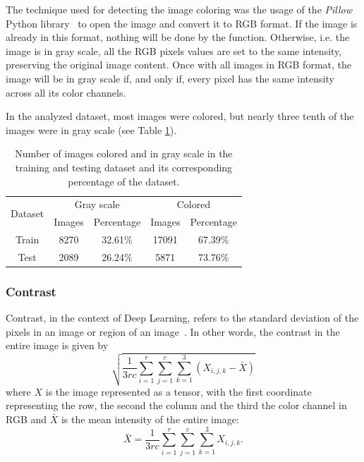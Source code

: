 \documentclass[12pt,
    brazil,			%
	english,        %
	]{article}
\begin{document}
The technique used for detecting the image coloring was the usage of the \textit{Pillow} Python library~\cite{pillow2019docs} to open the image and convert it to RGB format. If the image is already in this format, nothing will be done by the function. Otherwise, i.e. the image is in gray scale, all the RGB pixels values are set to the same intensity, preserving the original image content. Once with all images in RGB format, the image will be in gray scale if, and only if, every pixel has the same intensity across all its color channels.

In the analyzed dataset, most images were colored, but nearly three tenth of the images were in gray scale (see Table \ref{tab:color}).

\begin{table}[htb]
    \centering
    \setlength{\tabcolsep}{20pt} %
    \renewcommand{\arraystretch}{1.5} %
    \begin{tabular}{*{5}{c}}
        \toprule
        \multirow{2}{*}{Dataset}    & \multicolumn{2}{c}{Gray scale}    &   \multicolumn{2}{c}{Colored} \\
        \cmidrule(r){2-3} \cmidrule(r){4-5}
                                    & Images & Percentage               & Images & Percentage \\
        \midrule
        Train                       &   8270 &  32.61\%                 &  17091 &     67.39\% \\
        Test                        &   2089 &  26.24\%                 &   5871 &     73.76\% \\
        \bottomrule
    \end{tabular}
    \caption{Number of images colored and in gray scale in the training and testing dataset and its corresponding percentage of the dataset.}
    \label{tab:color}
\end{table}

\subsubsection{Contrast}

Contrast, in the context of Deep Learning, refers to the standard deviation of the pixels in an image or region of an image~\cite{goodfellow2016deep}. In other words, the contrast in the entire image is given by
\begin{equation}
\label{eq:constrast-rgb}
    \sqrt{\frac{1}{3rc}\sum_{i=1}^{r} \sum_{j=1}^{c} \sum_{k=1}^{3} \left(X_{i,j,k} - \bar{X}\right)}
\end{equation}
where $X$ is the image represented as a tensor, with the first coordinate representing the row, the second the column and the third the color channel in RGB and $\bar{X}$ is the mean intensity of the entire image:
\begin{equation}
    \bar{X} = \frac{1}{3rc} \sum_{i=1}^{r} \sum_{j=1}^{c} \sum_{k=1}^{3} X_{i,j,k}.
\end{equation}
\end{document}
